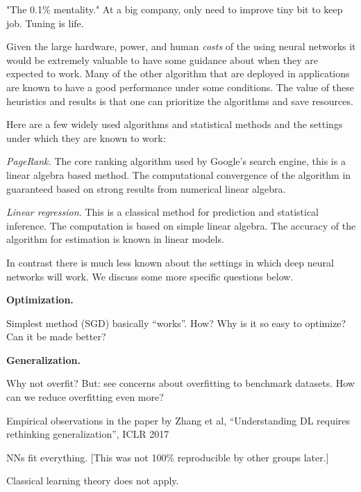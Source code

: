 \documentclass[english]{article}
\begin{document}
"The 0.1\% mentality." At a big company, only need to improve tiny bit to keep job. Tuning is life. 
\eitem

\item 
Given the large hardware, power, and human \emph{costs} of the using neural networks it would be extremely valuable to have some guidance about when they are expected to work.  Many of the other algorithm that are deployed in applications are known to have a good performance under some  conditions. The value of these heuristics and results is that one can prioritize the algorithms and  save resources. 

Here are  a few widely used algorithms and statistical methods and the settings under which they are known to work: 

\benum
\item \emph{PageRank.} The core ranking algorithm used by Google's search engine, this is a linear algebra based method. The computational  convergence of the algorithm in guaranteed based on  strong results from numerical linear algebra. 

\item \emph{Linear regression.} This is a classical method for  prediction and statistical inference. The computation is based on simple linear algebra. The accuracy of the algorithm  for estimation is known in linear models. 

\eenum

In contrast there is much less known about the settings in which deep neural networks will work. We discuss some more specific questions below. 

\item {\bf Optimization.}

Simplest method (SGD) basically ``works''. How? Why is it so easy to optimize? Can it be made better? 

\item {\bf Generalization.}

Why not overfit? But: see concerns about overfitting to benchmark datasets. How can we reduce overfitting even more? 

Empirical observations in the paper by Zhang et al, ``Understanding DL requires rethinking generalization'', ICLR 2017

\benum
\item NNs fit everything. [This was not 100\% reproducible by other groups later.]

Classical learning theory does not apply. 
\end{document}
